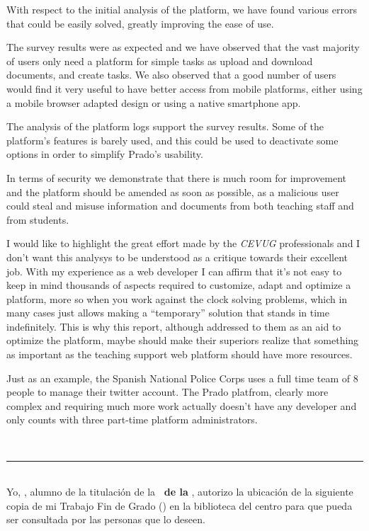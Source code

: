 {{\bigskip
With respect to the initial analysis of the platform, we have found various errors that could be easily solved, greatly improving the ease of use.

\bigskip
The survey results were as expected and we have observed that the vast majority of users only need a platform for simple tasks as upload and download documents, and create tasks. We also observed that a good number of users would find it very useful to have better access from mobile platforms, either using a mobile browser adapted design or using a native smartphone app.

\bigskip
The analysis of the platform logs support the survey results. Some of the platform’s features is barely used, and this could be used to deactivate some options in order to simplify Prado’s usability.

\bigskip
In terms of security we demonstrate that there is much room for improvement and the platform should be amended as soon as possible, as a malicious user could steal and misuse information and documents from both teaching staff and from students.

\bigskip
I would like to highlight the great effort made by the \textit{CEVUG} professionals and I don't want this analysys to be understood as a critique towards their excellent job. With my experience as a web developer I can affirm that it’s not easy to keep in mind thousands of aspects required to customize, adapt and optimize a platform, more so when you work against the clock solving problems, which in many cases just allows making a ``temporary'' solution that stands in time indefinitely. This is why this report, although addressed to them as an aid to optimize the platform, maybe should make their superiors realize that something as important as the teaching support web platform should have more resources.

\bigskip
Just as an example, the Spanish National Police Corps uses a full time team of 8 people to manage their twitter account. The Prado platfrom, clearly more complex and requiring much more work actually doesn't have any developer and only counts with three part-time platform administrators. 


\newpage
\thispagestyle{empty}
\
\vspace{3cm}

\noindent\rule[-1ex]{\textwidth}{2pt}\\[4.5ex]

Yo, \textbf{\autor}, alumno de la titulación \textbf{\grado} de la \textbf{\escuela\ de la \universidad}, autorizo la ubicación de la siguiente copia de mi Trabajo Fin de Grado (\textit{\titulo}) en la biblioteca del centro para que pueda ser consultada por las personas que lo deseen.

}}
